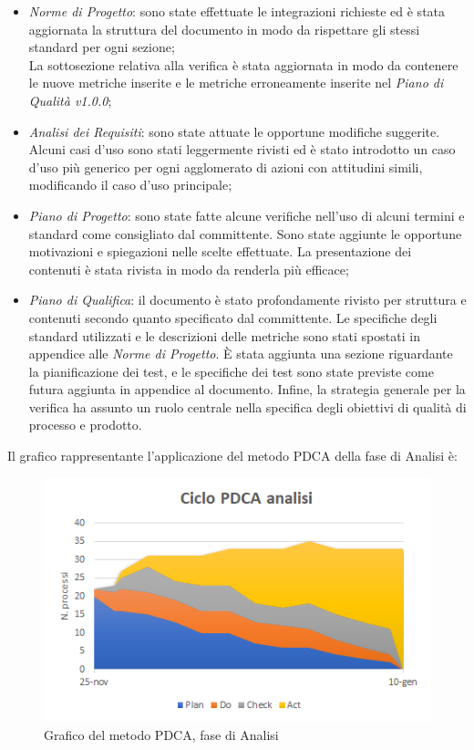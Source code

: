 \begin{itemize}
	\item\emph{Norme di Progetto}: sono state effettuate le integrazioni richieste ed è stata aggiornata la struttura del documento in modo da rispettare gli stessi standard per ogni sezione;\\
	La sottosezione relativa alla verifica è stata aggiornata in modo da contenere le nuove metriche inserite e le metriche erroneamente inserite nel \emph{Piano di Qualità v1.0.0};	\item\emph{Analisi dei Requisiti}: sono state attuate le opportune modifiche suggerite. Alcuni casi d'uso sono stati leggermente rivisti ed è stato introdotto un caso d'uso più generico per ogni agglomerato di azioni con attitudini simili, modificando il caso d'uso principale; 	
	\item\emph{Piano di Progetto}: sono state fatte alcune verifiche nell'uso di alcuni termini e standard come consigliato dal committente. Sono state aggiunte le opportune motivazioni e spiegazioni nelle scelte effettuate. La presentazione dei contenuti è stata rivista in modo da renderla più efficace;
	\item\emph{Piano di Qualifica}: il documento è stato profondamente rivisto per struttura e contenuti secondo quanto specificato dal committente.
	Le specifiche degli standard utilizzati e le descrizioni delle metriche sono stati spostati in appendice alle \emph{Norme di Progetto}. È stata aggiunta una sezione riguardante la pianificazione dei test, e le specifiche dei test sono state previste come futura aggiunta in appendice al documento. Infine, la strategia generale per la verifica ha assunto un ruolo centrale nella specifica degli obiettivi di qualità di processo e prodotto. 
\end{itemize}
\Spazio
Il grafico rappresentante l'applicazione del metodo PDCA della fase di Analisi è:
\begin{figure} [H]
	\centering
	\includegraphics[scale=1]{Img/Ciclo_PDCA}
	\caption{Grafico del metodo PDCA, fase di Analisi}\label{immagine:pdca analisi}
\end{figure}
